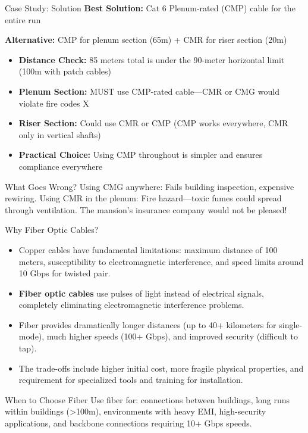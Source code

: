 \documentclass[aspectratio=169]{beamer}
\begin{document}
\begin{frame}{Case Study: Solution}
    \textbf{Best Solution:} Cat 6 Plenum-rated (CMP) cable for the entire run
    
    \textbf{Alternative:} CMP for plenum section (65m) + CMR for riser section (20m)
    
    \vspace{0.3cm}
    \begin{itemize}
        \item \textbf{Distance Check:} 85 meters total is under the 90-meter horizontal limit (100m with patch cables) {\color{networkgreen}\checkmark}
        \item \textbf{Plenum Section:} MUST use CMP-rated cable---CMR or CMG would violate fire codes {\color{networkred}X}
        \item \textbf{Riser Section:} Could use CMR or CMP (CMP works everywhere, CMR only in vertical shafts)
        \item \textbf{Practical Choice:} Using CMP throughout is simpler and ensures compliance everywhere
    \end{itemize}
    
    \vspace{0.3cm}
    \begin{alertblock}{What Goes Wrong?}
        Using CMG anywhere: Fails building inspection, expensive rewiring. Using CMR in the plenum: Fire hazard---toxic fumes could spread through ventilation. The mansion's insurance company would not be pleased!
    \end{alertblock}
\end{frame}

\begin{frame}{Why Fiber Optic Cables?}
    \begin{itemize}
        \item Copper cables have fundamental limitations: maximum distance of 100 meters, susceptibility to electromagnetic interference, and speed limits around 10 Gbps for twisted pair.
        \item \textbf{Fiber optic cables} use pulses of light instead of electrical signals, completely eliminating electromagnetic interference problems.
        \item Fiber provides dramatically longer distances (up to 40+ kilometers for single-mode), much higher speeds (100+ Gbps), and improved security (difficult to tap).
        \item The trade-offs include higher initial cost, more fragile physical properties, and requirement for specialized tools and training for installation.
    \end{itemize}
    
    \vspace{0.3cm}
    \begin{block}{When to Choose Fiber}
        Use fiber for: connections between buildings, long runs within buildings (>100m), environments with heavy EMI, high-security applications, and backbone connections requiring 10+ Gbps speeds.
    \end{block}
\end{frame}
\end{document}
